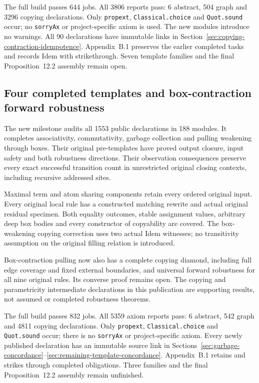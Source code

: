 The full build passes 644 jobs. All 3806 reports pass: 6 abstract, 504 graph
and 3296 copying declarations. Only \texttt{propext}, \texttt{Classical.choice}
and \texttt{Quot.sound} occur; no \texttt{sorryAx} or project-specific axiom is
used. The new modules introduce no warnings. All 90 declarations have
immutable links in Section~\ref{sec:copying-contraction-idempotence}.
Appendix~B.1 preserves the earlier completed tasks and records Idem with
strikethrough. Seven template families and the final Proposition~12.2
assembly remain open.


\subsection{Four completed templates and box-contraction forward robustness}
The new milestone audits all 1553 public declarations in 188 modules.
It completes associativity, commutativity, garbage collection and pulling
weakening through boxes. Their original pre-templates have proved output
closure, input safety and both robustness directions. Their observation
consequences preserve every exact successful transition count in unrestricted
original closing contexts, including recursive addressed sites.

Maximal term and atom sharing components retain every ordered original input.
Every original local rule has a constructed matching rewrite and actual
original residual specimen. Both equality outcomes, stable assignment values,
arbitrary deep box bodies and every constructor of copyability are covered.
The box-weakening copying correction uses two actual Idem witnesses; no
transitivity assumption on the original filling relation is introduced.

Box-contraction pulling now also has a complete copying diamond, including
full edge coverage and fixed external boundaries, and universal forward
robustness for all nine original rules. Its converse proof remains open.
The copying and parametricity intermediate declarations in this publication
are supporting results, not assumed or completed robustness theorems.

The full build passes 832 jobs. All 5359 axiom reports pass: 6 abstract,
542 graph and 4811 copying declarations. Only \texttt{propext},
\texttt{Classical.choice} and \texttt{Quot.sound} occur; there is no
\texttt{sorryAx} or project-specific axiom. Every newly published declaration
has an immutable source link in Sections~\ref{sec:garbage-concordance}--\ref{sec:remaining-template-concordance}.
Appendix~B.1 retains and strikes through completed obligations. Three
families and the final Proposition~12.2 assembly remain unfinished.


